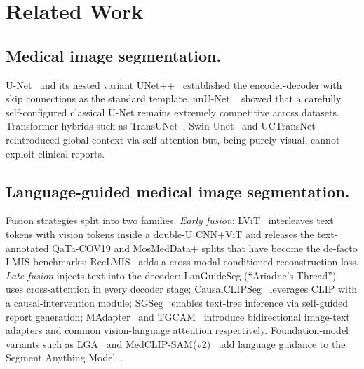\documentclass[runningheads]{llncs}
\begin{document}
\section{Related Work}
\label{sec:related}

\subsection{Medical image segmentation.}
U-Net~\cite{ronneberger2015unet} and its nested variant
UNet++~\cite{zhou2020unetpp} established the encoder-decoder
with skip connections as the standard template. nnU-Net
~\cite{isensee2021nnunet} showed that a carefully self-configured
classical U-Net remains extremely competitive across datasets.
Transformer hybrids such as TransUNet~\cite{chen2024transunet},
Swin-Unet~\cite{cao2022swinunet} and
UCTransNet~\cite{wang2022uctransnet} reintroduced global context
via self-attention but, being purely visual, cannot exploit clinical
reports.

\subsection{Language-guided medical image segmentation.}
Fusion strategies split into two families.
\emph{Early fusion}: LViT~\cite{li2023lvit} interleaves text tokens
with vision tokens inside a double-U CNN+ViT and releases the
text-annotated QaTa-COV19 and MosMedData+ splits that have become the
de-facto LMIS benchmarks; RecLMIS~\cite{huang2024reclmis} adds a
cross-modal conditioned reconstruction loss.
\emph{Late fusion} injects text into the decoder:
LanGuideSeg (``Ariadne's Thread'')~\cite{zhong2023ariadne} uses
cross-attention in every decoder stage; CausalCLIPSeg~\cite{chen2024causalclipseg}
leverages CLIP with a causal-intervention module;
SGSeg~\cite{ye2024sgseg} enables text-free inference via
self-guided report generation; MAdapter~\cite{zhang2024madapter} and
TGCAM~\cite{guo2024tgcam} introduce bidirectional image-text
adapters and common vision-language attention respectively. Foundation-model
variants such as LGA~\cite{hu2024lga} and
MedCLIP-SAM(v2)~\cite{koleilat2024medclipsam} add language guidance
to the Segment Anything Model~\cite{kirillov2023sam}.
\end{document}
